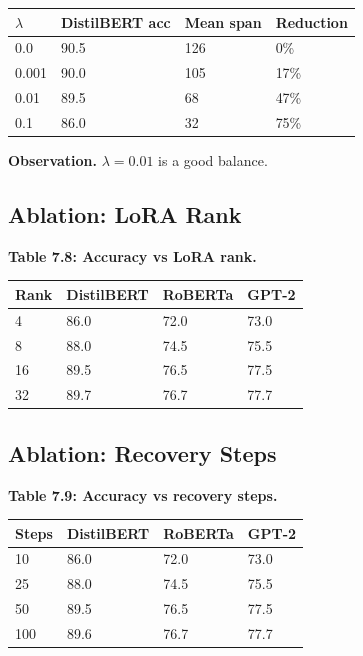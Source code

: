 \begin{table}[H]
\centering
\small
\begin{tabular}{llll}
\toprule
\textbf{$\lambda$} & \textbf{DistilBERT acc} & \textbf{Mean span} & \textbf{Reduction} \\
\midrule
0.0 & 90.5 & 126 & 0\% \\
0.001 & 90.0 & 105 & 17\% \\
0.01 & 89.5 & 68 & 47\% \\
0.1 & 86.0 & 32 & 75\% \\
\bottomrule
\end{tabular}
\end{table}

\textbf{Observation.} $\lambda = 0.01$ is a good balance.

\subsection{Ablation: LoRA Rank}

\textbf{Table 7.8: Accuracy vs LoRA rank.}

\begin{table}[H]
\centering
\small
\begin{tabular}{llll}
\toprule
\textbf{Rank} & \textbf{DistilBERT} & \textbf{RoBERTa} & \textbf{GPT-2} \\
\midrule
4 & 86.0 & 72.0 & 73.0 \\
8 & 88.0 & 74.5 & 75.5 \\
16 & 89.5 & 76.5 & 77.5 \\
32 & 89.7 & 76.7 & 77.7 \\
\bottomrule
\end{tabular}
\end{table}

\subsection{Ablation: Recovery Steps}

\textbf{Table 7.9: Accuracy vs recovery steps.}

\begin{table}[H]
\centering
\small
\begin{tabular}{llll}
\toprule
\textbf{Steps} & \textbf{DistilBERT} & \textbf{RoBERTa} & \textbf{GPT-2} \\
\midrule
10 & 86.0 & 72.0 & 73.0 \\
25 & 88.0 & 74.5 & 75.5 \\
50 & 89.5 & 76.5 & 77.5 \\
100 & 89.6 & 76.7 & 77.7 \\
\bottomrule
\end{tabular}
\end{table}

